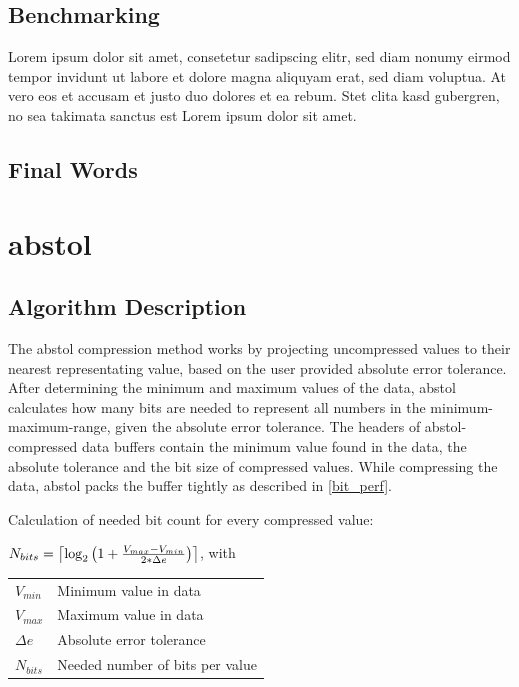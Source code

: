 \documentclass[
	12pt,
	a4paper,
	BCOR10mm,
	DIV14,
	headsepline,
]{scrreprt}
\DeclarePairedDelimiter{\ceil}{\lceil}{\rceil}
\begin{document}
\section{Benchmarking}
Lorem ipsum dolor sit amet, consetetur sadipscing elitr, sed diam nonumy eirmod tempor invidunt ut labore et dolore magna aliquyam erat, sed diam voluptua.
At vero eos et accusam et justo duo dolores et ea rebum.
Stet clita kasd gubergren, no sea takimata sanctus est Lorem ipsum dolor sit amet.

\section{Final Words}




\appendix
\appendixpage

\chapter{abstol}
\label{abstol}

\section{Algorithm Description}

\bigskip

The abstol compression method works by projecting uncompressed values to their
nearest representating value, based on the user provided absolute error
tolerance. After determining the minimum and maximum values of the data, abstol
calculates how many bits are needed to represent all numbers in the
minimum-maximum-range, given the absolute error tolerance. The headers of
abstol-compressed data buffers contain the minimum value found in the data, the
absolute tolerance and the bit size of compressed values. While compressing the
data, abstol packs the buffer tightly as described in \cref{bit_perf}. \\

\bigskip

Calculation of needed bit count for every compressed value:

\bigskip

\begin{center}
	$N_{bits}=\ceil[\big]{\log_2{\left(1 + \frac{V_{max} - V_{min}}{2 * \Delta{e}}\right)}}$, with

	\bigskip

	\begin{tabular}{ll}
		$V_{min}$ & Minimum value in data \\
		$V_{max}$ & Maximum value in data \\
		$\Delta{e}$ & Absolute error tolerance \\
		$N_{bits}$ & Needed number of bits per value
	\end{tabular}
\end{center}
\end{document}
